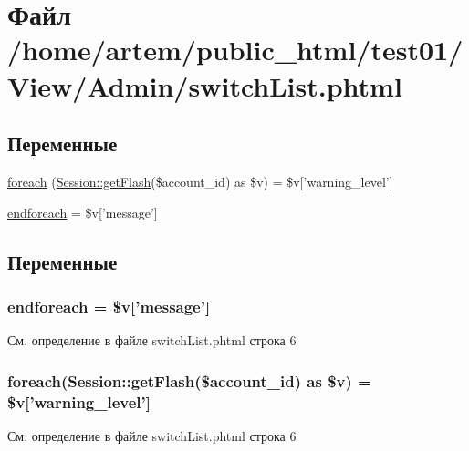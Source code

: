\hypertarget{switch_list_8phtml}{\section{Файл /home/artem/public\-\_\-html/test01/\-View/\-Admin/switch\-List.phtml}
\label{switch_list_8phtml}
}
\subsection*{Переменные}
\begin{DoxyCompactItemize}
\item 
\hyperlink{switch_list_8phtml_a1c191ff1be2612f80eabc75951f1841b}{foreach} (\hyperlink{class_session_ae4c4b98671bdd1fbfe4ae9defb5405ad}{Session\-::get\-Flash}(\$account\-\_\-id) as \$v) = \$v\mbox{[}'warning\-\_\-level'\mbox{]}
\item 
\hyperlink{switch_list_8phtml_a672d9707ef91db026c210f98cc601123}{endforeach} = \$v\mbox{[}'message'\mbox{]}
\end{DoxyCompactItemize}


\subsection{Переменные}
\hypertarget{switch_list_8phtml_a672d9707ef91db026c210f98cc601123}{
\subsubsection[{endforeach}]{\setlength{\rightskip}{0pt plus 5cm}endforeach = \$v\mbox{[}'message'\mbox{]}}}\label{switch_list_8phtml_a672d9707ef91db026c210f98cc601123}


См. определение в файле switch\-List.\-phtml строка 6

\hypertarget{switch_list_8phtml_a1c191ff1be2612f80eabc75951f1841b}{
\subsubsection[{foreach}]{\setlength{\rightskip}{0pt plus 5cm}foreach({\bf Session\-::get\-Flash}(\$account\-\_\-id) as \$v) = \$v\mbox{[}'warning\-\_\-level'\mbox{]}}}\label{switch_list_8phtml_a1c191ff1be2612f80eabc75951f1841b}


См. определение в файле switch\-List.\-phtml строка 6

